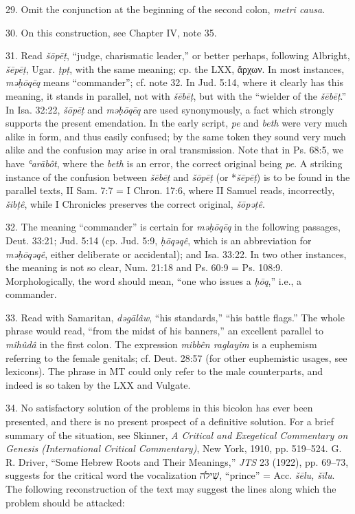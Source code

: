 \begin{enumerate}
29. Omit the conjunction at the beginning of the second colon, \emph{metri
causa}.

30. On this construction, see Chapter IV, note 35.

31. Read \emph{šōpēṭ}, ``judge, charismatic leader,'' or better perhaps,
following Albright, \emph{šēpēṭ}, Ugar. \emph{ṭpṭ}, with the same meaning; cp.
the LXX, ἄρχων. In most instances, \emph{məḥōqēq} means ``commander''; cf.
note 32. In Jud. 5:14, where it clearly has this meaning, it stands in parallel,
not with \emph{šēbēṭ}, but with the ``wielder of the \emph{šēbēṭ}.'' In
Isa. 32:22, \emph{šōpēṭ} and \emph{məḥōqēq} are used synonymously, a fact which
strongly supports the present emendation. In the early script, \emph{pe} and
\emph{beth} were very much alike in form, and thus easily confused; by the same
token they sound very much alike and the confusion may arise in oral
transmission. Note that in Ps. 68:5, we have \emph{ʿarābôt}, where the
\emph{beth} is an error, the correct original being \emph{pe}. A striking
instance of the confusion between \emph{šēbēṭ} and \emph{šōpēṭ} (or
*\emph{šēpēṭ}) is to be found in the parallel texts, II Sam. 7:7 =
I Chron. 17:6, where II Samuel reads, incorrectly, \emph{šibṭê}, while
I Chronicles preserves the correct original, \emph{šōpəṭê}.

32. The meaning ``commander'' is certain for \emph{məḥōqēq} in the following
passages, Deut. 33:21; Jud. 5:14 (cp. Jud. 5:9, \emph{ḥōqəqê}, which is an
abbreviation for \emph{məḥōqəqê}, either deliberate or accidental); and
Isa. 33:22. In two other instances, the meaning is not so clear, Num. 21:18 and
Ps. 60:9 = Ps. 108:9. Morphologically, the word should mean, ``one who issues a
\emph{ḥōq},'' i.e., a commander.

33. Read with Samaritan, \emph{dəgālâw}, ``his standards,'' ``his battle
flags.'' The whole phrase would read, ``from the midst of his banners,'' an
excellent parallel to \emph{mîhûdâ} in the first colon. The expression
\emph{mibbên raglayim} is a euphemism referring to the female genitals; cf.
Deut. 28:57 (for other euphemistic usages, see lexicons). The phrase in MT
could only refer to the male counterparts, and indeed is so taken by the LXX
and Vulgate.

34. No satisfactory solution of the problems in this bicolon has ever been
presented, and there is no present prospect of a definitive solution. For a
brief summary of the situation, see Skinner, \emph{A Critical and Exegetical
Commentary on Genesis (International Critical Commentary)}, New York, 1910,
pp. 519--524. G. R. Driver, ``Some Hebrew Roots and Their Meanings,'' \emph{JTS}
23 (1922), pp. 69--73, suggests for the critical word the vocalization
שִׁילֹה, ``prince'' = Acc. \emph{šēlu, šīlu}. The following reconstruction
of the text may suggest the lines along which the problem should be attacked:


\end{enumerate}
